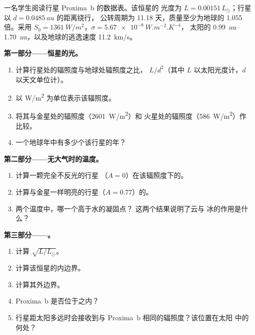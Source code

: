 \begin{problem}
\label{pb:g10:habitable-planet:1}
一名学生阅读行星 Proxima~b 的数据表。该恒星的
光度为 $L = 0.00151\,L_\odot$；行星以 $d = \qty{0.0485}{au}$ 的距离绕行，
公转周期为 11.18 天，质量至少为地球的 1.055 倍。采用
$S_0 = \qty{1361}{W/m^2}$，$\sigma = \qty{5.67e-8}{W.m^{-2}.K^{-4}}$，
太阳的 \qtyrange{0.99}{1.70}{au}，以及地球的逃逸速度
\qty{11.2}{km/s}。

\medskip
\noindent\textbf{第一部分——恒星的光。}
\begin{enumerate}
  \item 计算行星处的辐照度与地球处辐照度之比，
        $L/d^2$（其中 $L$ 以太阳光度计，$d$ 以天文单位计）。
  \item 以 \unit{W/m^2} 为单位表示该辐照度。
  \item 将其与金星处的辐照度（\qty{2601}{W/m^2}）和
        火星处的辐照度（\qty{586}{W/m^2}）作比较。
  \item 一个地球年中有多少个该行星的年？
\end{enumerate}

\medskip
\noindent\textbf{第二部分——无大气时的温度。}
\begin{enumerate}[resume]
  \item 计算一颗完全不反光的行星
        （$A = 0$）在该辐照度下的。
  \item 计算与金星一样明亮的行星（$A = 0.77$）的。
  \item 两个温度中，哪一个高于水的凝固点？
        这两个结果说明了云与
        冰的作用是什么？
\end{enumerate}

\medskip
\noindent\textbf{第三部分——。}
\begin{enumerate}[resume]
  \item 计算 $\sqrt{L/L_\odot}$。
  \item 计算该恒星的内边界。
  \item 计算其外边界。
  \item Proxima~b 是否位于之内？
  \item 行星距太阳多远时会接收到与
        Proxima~b 相同的辐照度？该位置在太阳
        中的何处？
\end{enumerate}


\end{problem}
